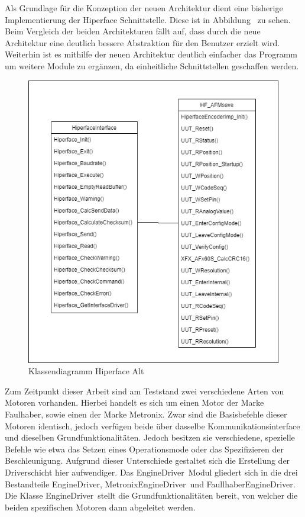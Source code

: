 Als Grundlage für die Konzeption der neuen Architektur dient eine bisherige Implementierung der Hiperface Schnittstelle. Diese ist in Abbildung \dq {}\dq~zu sehen. Beim Vergleich der beiden Architekturen fällt auf, dass durch die neue Architektur eine deutlich bessere Abstraktion für den Benutzer erzielt wird. Weiterhin ist es mithilfe der neuen Architektur deutlich einfacher das Programm um weitere Module zu ergänzen, da einheitliche Schnittstellen geschaffen werden.
\begin{figure}[h]
  \centering
   \includegraphics[width=1\textwidth]{img/Klassendiagramm_Hiperface_alt.jpg} 
   \caption{Klassendiagramm Hiperface Alt}
   \label{fig:Klassen_Hiperface_Alt.jpg}
\end{figure}
\cleardoublepage
Zum Zeitpunkt dieser Arbeit sind am Teststand zwei verschiedene Arten von Motoren vorhanden. Hierbei handelt es sich um einen Motor der Marke Faulhaber, sowie einen der Marke Metronix. Zwar sind die Basisbefehle dieser Motoren identisch, jedoch verfügen beide über dasselbe Kommunikationsinterface und dieselben Grundfunktionalitäten. Jedoch besitzen sie verschiedene, spezielle Befehle wie etwa das Setzen eines Operationsmode oder das Spezifizieren der Beschleunigung. Aufgrund dieser Unterschiede gestaltet sich die Erstellung der Driverschicht hier aufwendiger. Das \dq EngineDriver\dq~Modul gliedert sich in die drei Bestandteile \dq EngineDriver\dq, \dq MetronixEngineDriver\dq~und \dq FaullhaberEngineDriver\dq. Die Klasse \dq EngineDriver\dq~stellt die Grundfunktionalitäten bereit, von welcher die beiden spezifischen Motoren dann abgeleitet werden. 

